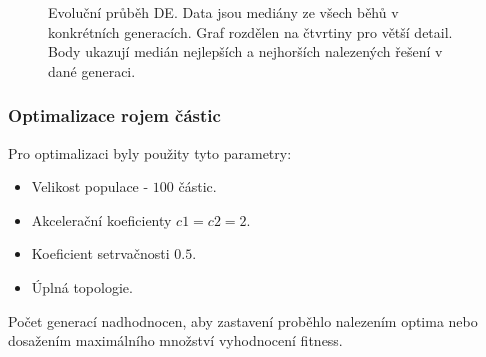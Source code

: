 \begin{figure}[H]
{\begin{tabular}{cc}
    \end{tabular}
    }
    \caption{Evoluční průběh DE. Data jsou mediány ze všech běhů v konkrétních generacích. Graf rozdělen na čtvrtiny pro větší detail. Body ukazují medián nejlepších a nejhorších nalezených řešení v dané generaci.}
    \label{fg:bench:ackley:de:evoProg}
\end{figure}
\subsubsection{Optimalizace rojem částic}
Pro optimalizaci byly použity tyto parametry:
\begin{itemize}
    \item Velikost populace - $100$ částic.
    \item Akcelerační koeficienty $c1 = c2 = 2$.
    \item Koeficient setrvačnosti $0.5$.
    \item Úplná topologie.
\end{itemize}
Počet generací nadhodnocen, aby zastavení proběhlo nalezením optima nebo dosažením maximálního množství vyhodnocení fitness.
